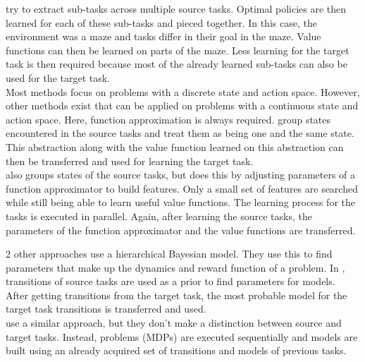 \documentclass[a4paper, 11pt]{article}
\begin{document}
\cite{journals/ml/FosterD02} try to extract sub-tasks across multiple source tasks. Optimal policies are then learned for each of these sub-tasks and pieced together. In this case, the environment was a maze and tasks differ in their goal in the maze. Value functions can then be learned on parts of the maze. Less learning for the target task is then required because most of the already learned sub-tasks can also be used for the target task.\\

Most methods focus on problems with a discrete state and action space. However, other methods exist that can be applied on problems with a continuous state and action space. Here, function approximation is always required. \cite{walsh2006transferring} group states encountered in the source tasks and treat them as being one and the same state. This abstraction along with the value function learned on this abstraction can then be transferred and used for learning the target task.\\
\cite{lazaric2008knowledge} also groups states of the source tasks, but does this by adjusting parameters of a function approximator to build features. Only a small set of features are searched while still being able to learn useful value functions. The learning process for the tasks is executed in parallel. Again, after learning the source tasks, the parameters of the function approximator and the value functions are transferred.

2 other approaches use a hierarchical Bayesian model. They use this to find parameters that make up the dynamics and reward function of a problem. In \cite{sunmola2006model}, transitions of source tasks are used as a prior to find parameters for models. After getting transitions from the target task, the most probable model for the target task transitions is transferred and used.\\
\cite{conf/icml/WilsonFRT07} use a similar approach, but they don't make a distinction between source and target tasks. Instead, problems (MDPs) are executed sequentially and models are built using an already acquired set of transitions and models of previous tasks.\\
\end{document}
